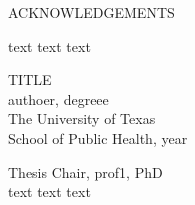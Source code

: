 \documentclass[12pt]{article}
\begin{document}
\newpage
\thispagestyle{empty}
\doublespacing
\begin{center}
ACKNOWLEDGEMENTS
\end{center}
text text text


\newpage
\thispagestyle{empty}
\doublespacing
\begin{center}
{\normalsize TITLE}\\[2.3cm]
\singlespacing
authoer, degreee\\
The University of Texas\\
School of Public Health, year
\end{center}

\doublespacing
\noindent
Thesis Chair, prof1, PhD\\
\indent
text text text
\end{document}
